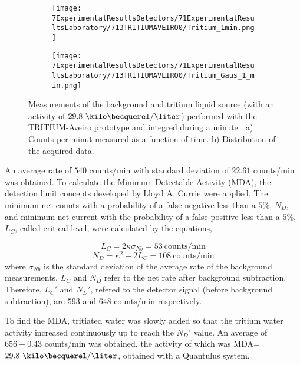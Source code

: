 \begin{figure}
\centering
    \begin{subfigure}[b]{0.45\textwidth}
    \centering
    \texttt{[image: 7ExperimentalResultsDetectors/71ExperimentalResultsLaboratory/713TRITIUMAVEIRO0/Tritium\_1min.png]}  
    \caption{\label{subfig:MeasurementInRealTime}}
    \end{subfigure}
    \hfill
    \begin{subfigure}[b]{0.45\textwidth}
    \centering
    \texttt{[image: 7ExperimentalResultsDetectors/71ExperimentalResultsLaboratory/713TRITIUMAVEIRO0/Tritium\_Gaus\_1\_min.png]}  
    \caption{\label{subfig:DistributionofMeasurement}}
    \end{subfigure}
 \caption{Measurements of the background and tritium liquid source (with an activity of $29.8~\kilo\becquerel/\liter$) performed with the TRITIUM-Aveiro prototype and integred during a minute \cite{ExperimentalPaperCarlos}. a) Counts per minut measured as a function of time. b) Distribution of the acquired data.}
 \label{fig:BackgroundTritium1min}
\end{figure}

An average rate of $540$ counts/min with standard deviation of $22.61$ counts/min was obtained. To calculate the Minimum Detectable Activity (MDA), the detection limit concepts developed by Lloyd A. Currie \cite{CurieLimit} were applied.  The minimum net counts with a probability of a false-negative less than a $5\%$, $N_D$, and minimum net current with the probability of a false-positive less than a $5\%$, $L_C$, called critical level, were calculated by the equations,

\begin{equation}
L_C = 2\kappa\sigma_{Nb} =53 ~\text{counts/min}
\label{eq:EquationCriticalLimit}
\end{equation}
\begin{equation}
N_D = \kappa^2 + 2L_C = 108~\text{counts/min}
\label{eq:EquationNetCounts}
\end{equation}
where $\sigma_{Nb}$ is the standard deviation of the average rate of the background measurements. $L_C$ and $N_D$ refer to the net rate after background subtraction. Therefore, $L_C'$ and $N_D'$, refered to the detector signal (before background subtraction), are $593$ and $648$ counts/min respectively.

To find the MDA, tritiated water was slowly added  so that the tritium water activity increased continuously up to reach the $N_D'$ value. An average of $656 \pm 0.43$ counts/min was obtained, the activity of which was MDA=$29.8~\kilo\becquerel/\liter$, obtained with a Quantulus system.


